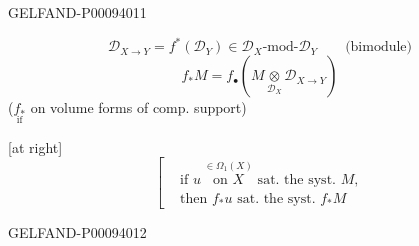 \begin{GelfandAdjacentEvidence}{GELFAND-P000940}{11}


\begin{equation*}
 \mathcal D_{X\to Y}=f^*(\mathcal D_Y)\in\mathcal D_X\text{-mod-}\mathcal D_Y
 \qquad\text{(bimodule)}
 \tag{2}
\end{equation*}
\begin{equation*}
 f_*M=f_\bullet\left(M\mathbin{\underset{\mathcal D_X}{\otimes}}\mathcal D_{X\to Y}\right)
 \tag{3}
\end{equation*}
(\(\underset{\text{if}}{f_*}\) on volume forms of comp. support)

[at right]
\[
 \left[\begin{aligned}
 &\text{if }u\ \overset{\in\Omega_1(X)}{\text{on $X$}}\text{ sat. the syst. }M,\\
 &\text{then }f_*u\text{ sat. the syst. }f_*M
 \end{aligned}\right.
\]
\end{GelfandAdjacentEvidence}
\begin{GelfandAdjacentEvidence}{GELFAND-P000940}{12}

\end{GelfandAdjacentEvidence}


